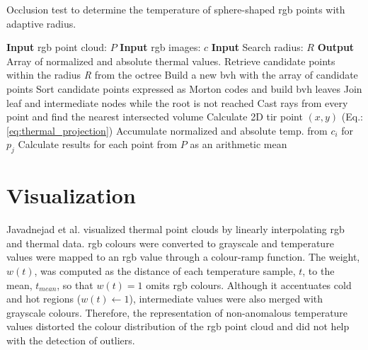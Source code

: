 \begin{algorithm}[hbt]
    \small
	\caption{Occlusion test to determine the temperature of sphere-shaped \acrshort{rgb} points with adaptive radius.}
	\label{alg:occlusion_test}
	\begin{algorithmic}[1]
    	\State \textbf{Input} \acrshort{rgb} point cloud: $P$ %
    	\State \textbf{Input} \acrshort{rgb} images: $c$ %
    	\State \textbf{Input} Search radius: $R$ %
        \State \textbf{Output} Array of normalized and absolute thermal values. %
		    \State Retrieve candidate points within the radius \textit{R} from the octree
		    \State Build a new \acrshort{bvh} with the array of candidate points %
		        \State Sort candidate points expressed as Morton codes and build \acrshort{bvh} leaves %
		        \State Join leaf and intermediate nodes while the root is not reached %
		    \EndProcedure
		        \State Cast rays from every point and find the nearest intersected volume %
		            \State Calculate 2D \acrshort{tir} point $(x, y)$ (Eq.: \ref{eq:thermal_projection}) %
		                \State Accumulate normalized and absolute temp. from $c_i$ for $p_j$ %
	    	        \EndIf
	    	    \EndIf
		    \EndFor
		\EndFor
		\State Calculate results for each point from $P$ as an arithmetic mean %
	\end{algorithmic}
    \normalsize
\end{algorithm} 

\section{Visualization}

Javadnejad et al. \cite{javadnejad_photogrammetric_2020} visualized thermal point clouds by linearly interpolating \acrshort{rgb} and thermal data. \acrshort{rgb} colours were converted to grayscale and temperature values were mapped to an \acrshort{rgb} value through a colour-ramp function. The weight, $w(t)$, was computed as the distance of each temperature sample, $t$, to the mean, $t_{\textit{mean}}$, so that $w(t) = 1$ omits \acrshort{rgb} colours. Although it accentuates cold and hot regions ($w(t) \gets 1$), intermediate values were also merged with grayscale colours. Therefore, the representation of non-anomalous temperature values distorted the colour distribution of the \acrshort{rgb} point cloud and did not help with the detection of outliers.

